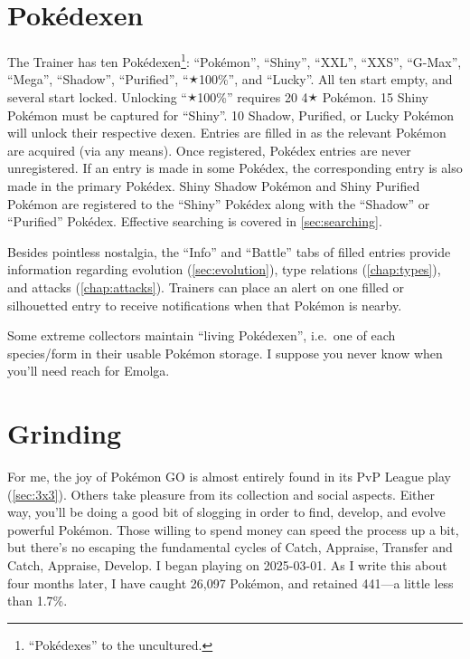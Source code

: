 \section{Pokédexen\label{sec:dexen}}
The Trainer has ten Pokédexen\footnote{``Pokédexes'' to the uncultured.}:
  ``Pokémon'', ``Shiny'', ``XXL'', ``XXS'', ``G-Max'', ``Mega'', ``Shadow'',
  ``Purified'', ``🟉100\%'', and ``Lucky''.
All ten start empty, and several start locked.
Unlocking ``🟉100\%'' requires 20 4🟉 Pokémon.
15 Shiny Pokémon must be captured for ``Shiny''.
10 Shadow, Purified, or Lucky Pokémon will unlock their respective dexen.
Entries are filled in as the relevant Pokémon are acquired (via any means).
Once registered, Pokédex entries are never unregistered.
If an entry is made in some Pokédex, the corresponding entry is also made
  in the primary Pokédex.
Shiny Shadow Pokémon and Shiny Purified Pokémon are registered to the
  ``Shiny'' Pokédex along with the ``Shadow'' or ``Purified'' Pokédex.
Effective searching is covered in \autoref{sec:searching}.

Besides pointless nostalgia, the ``Info'' and ``Battle'' tabs of filled entries
  provide information regarding evolution (\autoref{sec:evolution}), type
  relations (\autoref{chap:types}), and attacks (\autoref{chap:attacks}).
Trainers can place an alert on one filled or silhouetted entry to receive
  notifications when that Pokémon is nearby.

\begin{tipbox}[title=Living Pokédexen]
Some extreme collectors maintain ``living Pokédexen'', i.e.\ one of each
  species/form in their usable Pokémon storage.
I suppose you never know when you'll need reach for Emolga.
\end{tipbox}

\section{Grinding\label{sec:grinding}}
For me, the joy of Pokémon GO is almost entirely found in its PvP League play (\autoref{sec:3x3}).
Others take pleasure from its collection and social aspects.
Either way, you'll be doing a good bit of slogging in order to find, develop,
  and evolve powerful Pokémon.
Those willing to spend money can speed the process up a bit, but there's
  no escaping the fundamental cycles of Catch, Appraise, Transfer and
  Catch, Appraise, Develop. 
I began playing on 2025-03-01.
As I write this about four months later, I have caught 26,097 Pokémon, and retained 441---a little less than 1.7\%.

